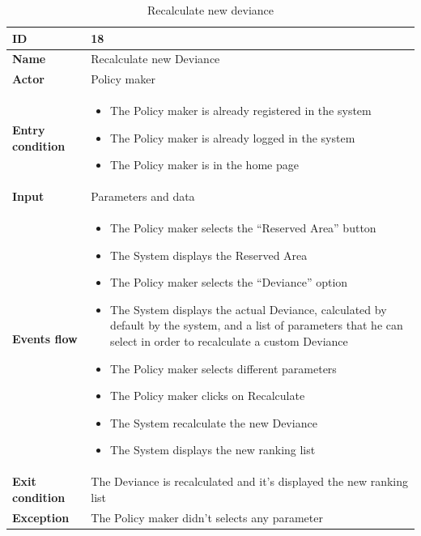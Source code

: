          \begin{longtable}{p{} | p{}}
          \caption{Recalculate new deviance}
    \label{tab:recalculate_new_deviance}\\
        \hline
        \textbf{ID} & 18\\
        \hline
        \textbf{Name}  &  Recalculate new Deviance\\
        \hline
        \textbf{Actor}  &  Policy maker\\
        \hline
        \textbf{Entry condition}  &  \begin{itemize}
            \item The Policy maker is already registered in the system
            \item The Policy maker is already logged in the system
            \item The Policy maker is in the home page
        \end{itemize}\\
        \hline
        \textbf{Input} & Parameters and data\\
        \hline
        \textbf{Events flow} & \begin{itemize}
                \item The Policy maker selects the “Reserved Area” button
                \item The System displays the Reserved Area
                \item The Policy maker selects the “Deviance” option
                \item The System displays the actual Deviance, calculated by default by the system, and a list of parameters that he can select in order to recalculate a custom Deviance
                \item The Policy maker selects different parameters
                \item The Policy maker clicks on Recalculate
                \item The System recalculate the new Deviance
                \item The System displays the new ranking list

                \end{itemize}
                 \\
        \hline
        \textbf{Exit condition} & The Deviance is recalculated and it's displayed the new ranking list\\
        \hline
        \textbf{Exception} & The Policy maker didn’t selects any parameter\\ \hline
        
    
    \end{longtable}
    
